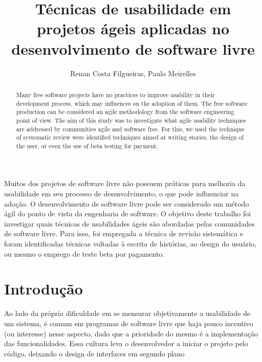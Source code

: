 \documentclass[12pt]{article}
\title{Técnicas de usabilidade em projetos ágeis aplicadas no desenvolvimento de software livre}
\author{Renan Costa Filgueiras, Paulo Meirelles}
\begin{document}
\maketitle
\begin{abstract}
Many free software projects have no practices to improve usability in their development process, which may influences on the adoption of them.
%
The free software production can be considered an agile methodology from the software engineering point of view.
%
The aim of this study was to investigate what agile usability techniques are addressed by communities agile and software free.
%
For this, we used the technique of systematic review were identified techniques aimed at writing stories, the design of the user, or even the use of beta testing for payment.

\end{abstract}

\begin{resumo}
Muitos dos projetos de software livre não possuem práticas para melhoria da usabilidade em seu processo de desenvolvimento, o que pode influenciar na adoção.
%
O desenvolvimento de software livre pode ser considerado um método ágil do ponto de vista da engenharia de software.
%
O objetivo deste trabalho foi investigar quais técnicas de usabilidades ágeis são abordadas pelas comunidades de software livre.
%
Para isso, foi empregada a técnica de revisão sistemática e foram identificadas técnicas voltadas à escrita de histórias, ao design do usuário, ou mesmo o emprego de teste beta por pagamento.

\end{resumo}

\section{Introdução}
\label{introducao}
Ao lado da própria dificuldade em se mensurar objetivamente a usabilidade de um sistema, é comum em programas de software livre que haja pouco incentivo (ou interesse) nesse aspecto, dado que a prioridade do mesmo é a implementação das funcionalidades. Essa cultura leva o desenvolvedor a iniciar o projeto pelo código, deixando o design de interfaces em segundo plano~\cite{} %
%
\end{document}
